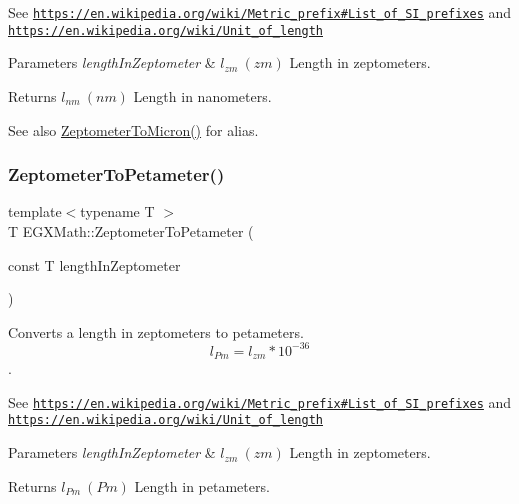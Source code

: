 See \href{https://en.wikipedia.org/wiki/Metric_prefix#List_of_SI_prefixes}{\tt https\+://en.\+wikipedia.\+org/wiki/\+Metric\+\_\+prefix\#\+List\+\_\+of\+\_\+\+S\+I\+\_\+prefixes} and \href{https://en.wikipedia.org/wiki/Unit_of_length}{\tt https\+://en.\+wikipedia.\+org/wiki/\+Unit\+\_\+of\+\_\+length} 
\begin{DoxyParams}{Parameters}
{\em length\+In\+Zeptometer} & $ l_{zm}\ (zm)$ Length in zeptometers. \\
\hline
\end{DoxyParams}
\begin{DoxyReturn}{Returns}
$ l_{nm}\ (nm)$ Length in nanometers. 
\end{DoxyReturn}
\begin{DoxySeeAlso}{See also}
\mbox{\hyperlink{group___e_g_x_math-_conversions-_length_conversions-_zeptometer-_non-_s_i_ga0bd42e8489b135f27530a247193286da}{Zeptometer\+To\+Micron()}} for alias. 
\end{DoxySeeAlso}
\mbox{\label{group___e_g_x_math-_conversions-_length_conversions-_zeptometer-_s_i_ga8d63077fa2d65649004804647da5af60}} 
\subsubsection{\texorpdfstring{Zeptometer\+To\+Petameter()}{ZeptometerToPetameter()}}
{\footnotesize\ttfamily template$<$typename T $>$ \\
T E\+G\+X\+Math\+::\+Zeptometer\+To\+Petameter (\begin{DoxyParamCaption}\item[{const T}]{length\+In\+Zeptometer }\end{DoxyParamCaption})}



Converts a length in zeptometers to petameters. \[ l_{Pm}=l_{zm} * 10^{-36} \]. 

See \href{https://en.wikipedia.org/wiki/Metric_prefix#List_of_SI_prefixes}{\tt https\+://en.\+wikipedia.\+org/wiki/\+Metric\+\_\+prefix\#\+List\+\_\+of\+\_\+\+S\+I\+\_\+prefixes} and \href{https://en.wikipedia.org/wiki/Unit_of_length}{\tt https\+://en.\+wikipedia.\+org/wiki/\+Unit\+\_\+of\+\_\+length} 
\begin{DoxyParams}{Parameters}
{\em length\+In\+Zeptometer} & $ l_{zm}\ (zm)$ Length in zeptometers. \\
\hline
\end{DoxyParams}
\begin{DoxyReturn}{Returns}
$ l_{Pm}\ (Pm)$ Length in petameters. 
\end{DoxyReturn}
\mbox{\label{group___e_g_x_math-_conversions-_length_conversions-_zeptometer-_s_i_gae7409493227692a85b7fa5016a007de3}} 
